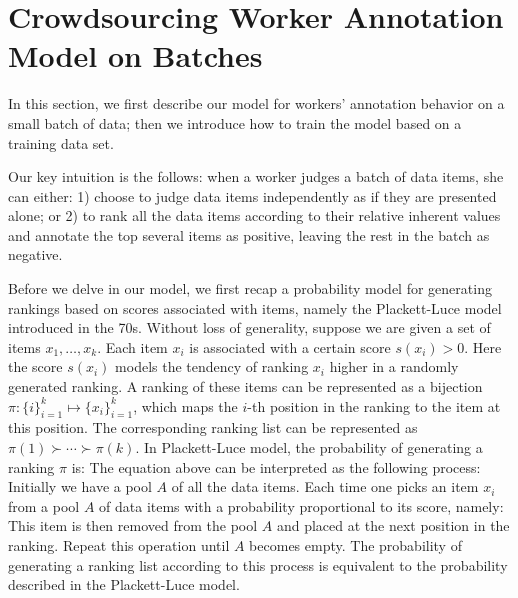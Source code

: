 \section{Crowdsourcing Worker Annotation Model on Batches}
\label{sec:worker}

In this section, we first describe our model for workers' annotation behavior on a small batch of data;
then we introduce how to train the model based on a training data set.

Our key intuition is the follows:
when a worker judges a batch of data items,
she can either:
1) choose to judge data items independently as if they are presented alone; or
2) to rank all the data items according to their relative inherent values
and annotate the top several items as positive, leaving the rest in the batch as negative.

%

Before we delve in our model, we first recap a probability model for generating rankings
based on scores associated with items, namely the Plackett-Luce model~\cite{luce:2005, plackett:1975} introduced in the 70s.
Without loss of generality, suppose we are given a set of items $x_1, \ldots, x_k$.
Each item $x_i$ is associated with a certain score $s(x_i) > 0$.  %
Here the score $s(x_i)$ models the tendency of ranking $x_i$ higher in a randomly generated ranking.
A ranking of these items can be represented as a bijection $\pi : \{i\}_{i = 1}^k \mapsto \{x_i\}_{i = 1}^k$,
which maps the $i$-th position in the ranking to the item at this position.
The corresponding ranking list can be represented as
$\pi(1) \succ \cdots \succ \pi(k)$.
In Plackett-Luce model, the probability of generating a ranking $\pi$ is:
%
The equation above can be interpreted as the following process:
Initially we have a pool $A$ of all the data items.
Each time one picks an item $x_i$ from a pool $A$ of data items with a probability proportional to its score, namely:
This item is then removed from the pool $A$ and placed at the next position in the ranking.
Repeat this operation until $A$ becomes empty.
The probability of generating a ranking list according to this process is equivalent to the probability described in the Plackett-Luce model.

